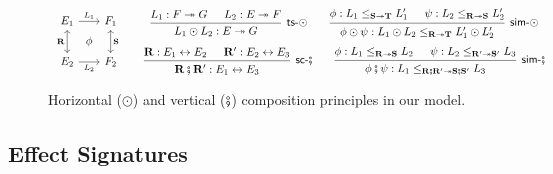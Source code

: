 \documentclass[acmsmall,screen,review,nonacm]{acmart}
\newcommand{\kw}[1]{\ensuremath{ \mathsf{#1} }}
\newcommand{\vcomp}{\fatsemi}
\begin{document}


\begin{figure} %
  \[
  \begin{array}{c}
    \begin{tikzcd}[sep=0.5ex]
      E_1 \ar[dd, leftrightarrow, "\mathbf{R}"']
	  \ar[rr, "L_1"] &&
      F_1 \ar[dd, leftrightarrow, "\mathbf{S}"] \\
      & \phi & \\
      E_2 \ar[rr, "L_2"'] &&
      F_2
    \end{tikzcd}
  \end{array}
  \quad
  \begin{array}{c}
    \begin{prooftree}
      \hypo{L_1 : F \twoheadrightarrow G}
      \hypo{L_2 : E \twoheadrightarrow F}
      \infer2[\kw{ts}-$\odot$]{L_1 \odot L_2 : E \twoheadrightarrow G}
    \end{prooftree}
    \qquad
    \begin{prooftree}
      \hypo{\phi: L_1 \le_{\mathbf{S} \twoheadrightarrow \mathbf{T}} L_1'}
      \hypo{\psi: L_2 \le_{\mathbf{R} \twoheadrightarrow \mathbf{S}} L_2'}
      \infer2[\kw{sim}-$\odot$]{\phi \odot \psi :
	L_1 \odot L_2 \le_{\mathbf{R} \twoheadrightarrow \mathbf{T}} L_1' \odot L_2'}
    \end{prooftree}
    \\[1.5em]
    \begin{prooftree}
      \hypo{\mathbf{R} : E_1 \leftrightarrow E_2}
      \hypo{\mathbf{R}' : E_2 \leftrightarrow E_3}
      \infer2[\kw{sc}-$\vcomp$]{\mathbf{R} \vcomp \mathbf{R}' : E_1 \leftrightarrow E_3}
    \end{prooftree}
    \qquad
    \begin{prooftree}
      \hypo{\phi : L_1 \le_{\mathbf{R} \twoheadrightarrow \mathbf{S}} L_2}
      \hypo{\psi : L_2 \le_{\mathbf{R'} \twoheadrightarrow \mathbf{S'}} L_3}
      \infer2[\kw{sim}-$\vcomp$]{\phi \vcomp \psi : L_1 \le_{\mathbf{R} \vcomp \mathbf{R'} \twoheadrightarrow
	\mathbf{S} \vcomp \mathbf{S'}} L_3}
    \end{prooftree}
  \end{array}
\]
  \caption{Horizontal ($\odot$) and vertical ($\vcomp$)
    composition principles in our model.}
  \label{fig:hvcomp}
\end{figure}

\subsection{Effect Signatures} \label{sec:esig} %
\end{document}
